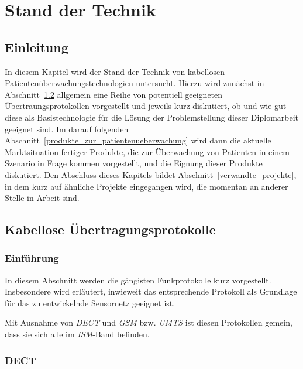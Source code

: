 
\chapter{Stand der Technik}\label{Stand der Technik}

\section{Einleitung}
In diesem Kapitel wird der Stand der Technik von kabellosen Patientenüberwachungstechnologien untersucht. 
Hierzu wird zunächst in Abschnitt~\ref{kabellose_uebertragungsprotokolle} allgemein eine Reihe von potentiell
geeigneten Übertraungsprotokollen vorgestellt und jeweils kurz diskutiert, ob und wie gut diese als 
Basistechnologie für die Lösung der Problemstellung dieser Diplomarbeit geeignet sind. Im darauf folgenden
Abschnitt~\ref{produkte_zur_patientenueberwachung} wird dann die aktuelle Marktsituation fertiger Produkte,
die zur Überwachung von Patienten in einem -Szenario in Frage kommen vorgestellt, und die Eignung dieser
Produkte diskutiert. Den Abschluss dieses Kapitels bildet Abschnitt~\ref{verwandte_projekte}, in dem
kurz auf ähnliche Projekte eingegangen wird, die momentan an anderer Stelle in Arbeit sind.

\section{Kabellose Übertragungsprotokolle}\label{kabellose_uebertragungsprotokolle}
    \subsection{Einführung}
        In diesem Abschnitt werden die gängisten Funkprotokolle kurz vorgestellt. Insbesondere wird erläutert,
        inwieweit das entsprechende Protokoll als Grundlage für das zu entwickelnde Sensornetz geeignet ist.

        Mit Ausnahme von \emph{DECT} und \emph{GSM} bzw. \emph{UMTS} ist diesen Protokollen gemein, dass 
        sie sich alle im \emph{ISM}-Band befinden. 

    \subsection{DECT}

